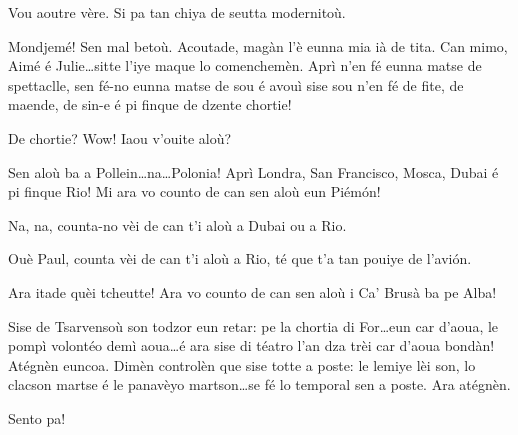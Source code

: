 \begin{drama}
\Maganspeaks Vou aoutre vère. Si pa tan chiya de seutta modernitoù.


\Paganspeaks Mondjemé! Sen mal betoù.  Acoutade, magàn l'è eunna mia ià de tita. Can mimo, Aimé é Julie\ldots sitte l'iye maque lo comenchemèn. Aprì n'en fé eunna matse de spettaclle, sen fé-no eunna matse de sou é avouì sise sou n'en fé de fite, de maende, de sin-e é pi finque de dzente chortie!

\Nevaousaspeaks De chortie? Wow! Iaou v'ouite aloù?

\Paganspeaks Sen aloù ba a Pollein\ldots na\ldots Polonia! Aprì Londra, San Francisco,  Mosca, Dubai é pi finque Rio! Mi ara vo counto de can sen aloù eun Piém\'on!

\Nevaouspeaks Na, na, counta-no vèi de can t'i aloù a Dubai ou a Rio.

 
\Maganspeaks Ouè Paul, counta vèi de can t'i aloù a Rio, té que t'a tan pouiye de l’avi\'on.

\Paganspeaks{} Ara itade quèi tcheutte! Ara vo counto de can sen aloù i Ca' Brusà ba pe Alba! 






\Chauffeurspeaks Sise de Tsarvensoù son todzor eun retar: pe la chortia di For\ldots eun car d'aoua, le pompì volontéo demì aoua\ldots é ara sise di téatro l'an dza trèi car d'aoua bondàn! Atégnèn euncoa. Dimèn controlèn que sise totte a poste: le lemiye lèi son, lo clacson martse é le panavèyo martson\ldots se fé lo temporal sen a poste. Ara atégnèn.


\Chauffeurspeaks Sento pa!



\end{drama}
